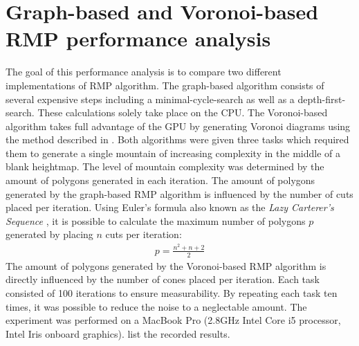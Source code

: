 \documentclass[11pt,a4paper,twoside,openright]{report}
\begin{document}
\section[Graph-based and Voronoi-based RMP performance analysis]{Graph-based and Voronoi-based RMP performance analysis%
}
The goal of this performance analysis is to compare two different implementations of RMP algorithm. The graph-based algorithm consists of several expensive steps including a minimal-cycle-search as well as a depth-first-search. These calculations solely take place on the CPU. The Voronoi-based algorithm takes full advantage of the GPU by generating Voronoi diagrams using the method described in . Both algorithms were given three tasks which required them to generate a single mountain of increasing complexity in the middle of a blank heightmap. The level of mountain complexity was determined by the amount of polygons generated in each iteration. The amount of polygons generated by the graph-based RMP algorithm is influenced by the number of cuts placed per iteration. Using Euler's formula also known as the \emph{Lazy Carterer's Sequence} \cite{Moore:1991}, it is possible to calculate the maximum number of polygons $p$ generated by placing $n$ cuts per iteration:
\begin{align}
  p = \frac{n^2 + n + 2}{2}
\end{align}
The amount of polygons generated by the Voronoi-based RMP algorithm is directly influenced by the number of cones placed per iteration. Each task consisted of 100 iterations to ensure measurability. By repeating each task ten times, it was possible to reduce the noise to a neglectable amount. The experiment was performed on a MacBook Pro (2.8GHz Intel Core i5 processor, Intel Iris onboard graphics).  list the recorded results.
\end{document}
